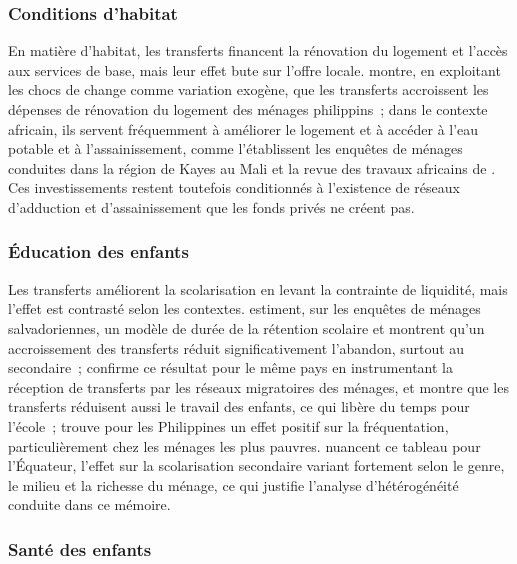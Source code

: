 \subsubsection{Conditions d'habitat}

En matière d'habitat, les transferts financent la rénovation du logement et
l'accès aux services de base, mais leur effet bute sur l'offre locale.
\textcite{yang2008} montre, en exploitant les chocs de change comme
variation exogène, que les transferts accroissent les dépenses de rénovation
du logement des ménages philippins~; dans le contexte africain, ils servent
fréquemment à améliorer le logement et à accéder à l'eau potable et à
l'assainissement, comme l'établissent les enquêtes de ménages conduites
dans la région de Kayes au Mali \parencite{gubert2002} et la revue des
travaux africains de \textcite{azam2006}. Ces investissements
restent toutefois conditionnés à l'existence de réseaux d'adduction et
d'assainissement que les fonds privés ne créent pas.

\subsubsection{Éducation des enfants}

Les transferts améliorent la scolarisation en levant la contrainte de
liquidité, mais l'effet est contrasté selon les contextes.
\textcite{cox2003} estiment, sur les enquêtes de ménages salvadoriennes,
un modèle de durée de la rétention scolaire et montrent qu'un accroissement
des transferts réduit significativement l'abandon, surtout au secondaire~;
\textcite{acosta2011} confirme ce résultat pour le même pays en
instrumentant la réception de transferts par les réseaux migratoires des
ménages, et montre que les transferts réduisent aussi le travail des
enfants, ce qui libère du temps pour l'école~; \textcite{yang2008} trouve pour les
Philippines un effet positif sur la fréquentation, particulièrement chez
les ménages les plus pauvres. \textcite{bucheli2018} nuancent ce tableau
pour l'Équateur, l'effet sur la scolarisation secondaire variant fortement
selon le genre, le milieu et la richesse du ménage, ce qui justifie
l'analyse d'hétérogénéité conduite dans ce mémoire.

\subsubsection{Santé des enfants}

